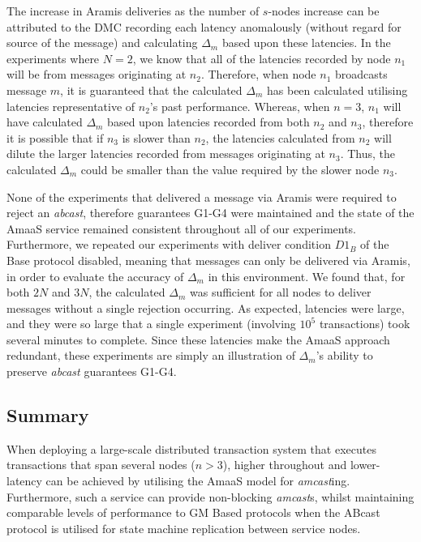	The increase in \textsf{Aramis} deliveries as the number of $s$-nodes increase can be attributed to the DMC recording each latency anomalously (without regard for source of the message) and calculating $\Delta_m$ based upon these latencies.  In the experiments where $N=2$, we know that all of the latencies recorded by node $n_1$ will be from messages originating at $n_2$.  Therefore, when node $n_1$ broadcasts message $m$, it is guaranteed that the calculated $\Delta_m$ has been calculated utilising latencies representative of $n_2$'s past performance.  Whereas, when $n=3$, $n_1$ will have calculated $\Delta_m$ based upon latencies recorded from both $n_2$ and $n_3$, therefore it is possible that if $n_3$ is slower than $n_2$, the latencies calculated from $n_2$ will dilute the larger latencies recorded from messages originating at $n_3$.  Thus, the calculated $\Delta_m$ could be smaller than the value required by the slower node $n_3$.  
	
	None of the experiments that delivered a message via \textsf{Aramis} were required to reject an \emph{abcast}, therefore guarantees G1-G4 were maintained and the state of the \textsf{AmaaS} service remained consistent throughout all of our experiments.  Furthermore, we repeated our experiments with deliver condition $D1_B$ of the \textsf{Base} protocol disabled, meaning that messages can only be delivered via \textsf{Aramis}, in order to evaluate the accuracy of $\Delta_m$ in this environment.  We found that, for both $2N$ and $3N$, the calculated $\Delta_m$ was sufficient for all nodes to deliver messages without a single rejection occurring.  As expected, latencies were large, and they were so large that a single experiment (involving $10^5$ transactions) took several minutes to complete.  Since these latencies make the \textsf{AmaaS} approach redundant, these experiments are simply an illustration of $\Delta_m$'s ability to preserve \emph{abcast} guarantees G1-G4.  
		
	\subsection{Summary}
	When deploying a large-scale distributed transaction system that executes transactions that span several nodes ($n > 3$), higher throughout and lower-latency can be achieved by utilising the \textsf{AmaaS} model for \emph{amcast}ing.  Furthermore, such a service can provide non-blocking \emph{amcast}s, whilst maintaining comparable levels of performance to GM Based protocols when the  \textsf{ABcast} protocol is utilised for state machine replication between service nodes.  

